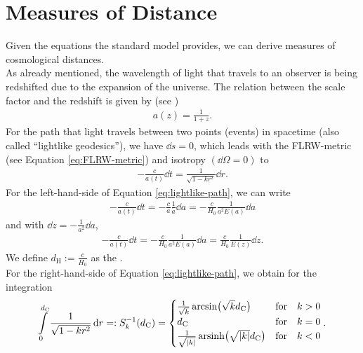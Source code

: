 \newpage
\section{Measures of Distance}

Given the equations the standard model provides, we can derive measures of cosmological distances. \\
As already mentioned, the wavelength of light that travels to an observer is being redshifted due to the expansion of the universe. The relation between the scale factor and the redshift is given by (see \cite[p.~9]{Bartelmann2019})
\begin{align}
    a(z) = \frac{1}{1 + z}. \label{eq:scale-factor-redshift-relation}
\end{align}
For the path that light travels between two points (events) in spacetime (also called ``lightlike geodesics''), we have $\dd{s} = 0$, which leads with the FLRW-metric (see Equation \eqref{eq:FLRW-metric}) and isotropy $(\dd{\Omega} = 0)$ to 
\begin{align}
    - \frac{c}{a(t)} \dd{t} = \frac{1}{\sqrt{1 - kr^2}} \dd{r}. \label{eq:lightlike-path} 
\end{align}
For the left-hand-side of Equation \eqref{eq:lightlike-path}, we can write 
\begin{align}
    - \frac{c}{a(t)} \dd{t} = - \frac{c}{a} \frac{1}{\dot{a}} \dd{a} = - \frac{c}{H_{0}} \frac{1}{a^2 E(a)} \dd{a}
\end{align}
and with $\displaystyle \dd{z} = - \frac{1}{a^2} \dd{a}$, 
\begin{align}
    - \frac{c}{a(t)} \dd{t} = - \frac{c}{H_{0}} \frac{1}{a^2 E(a)} \dd{a} = \frac{c}{H_{0}} \frac{1}{E(z)} \dd{z}. \label{eq:RHS-lightlike-path}
\end{align}
We define $\displaystyle d_{\text{H}} := \frac{c}{H_{0}}$ as the . \\
For the right-hand-side of Equation \eqref{eq:lightlike-path}, we obtain for the integration
\begin{align}
    \int\limits_{0}^{d_{\text{C}}} \frac{1}{\sqrt{1 - kr^2}} \dd{r} =: S^{-1}_{k}(d_{\text{C}}) = \begin{cases} \frac{1}{\sqrt{k}} \arcsin \bigl( \sqrt{k} d_{\text{C}} \bigr) &\text{for} \quad k > 0 \\ d_{\text{C}} &\text{for} \quad k = 0 \\ \frac{1}{\sqrt{\vert k \vert}} \operatorname{arsinh} \bigl(\sqrt{\vert k \vert} d_{\text{C}} \bigr) &\text{for} \quad k < 0 \end{cases}.
\end{align}
